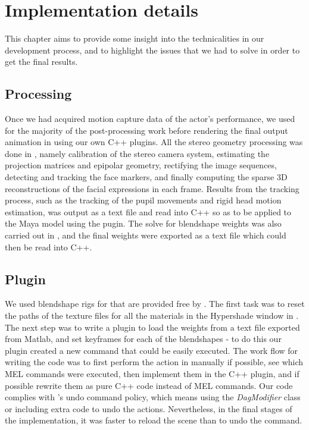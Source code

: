 \chapter{Implementation details}
\label{ch:implementation_details}

This chapter aims to provide some insight into the technicalities in our development process, and to highlight the issues that we had to solve in order to get the final results. 

\section{\Matlab Processing}

Once we had acquired motion capture data of the actor's performance, we used \Matlab for the majority of the post-processing work before rendering the final output animation in \Maya using our own C++ plugins. All the stereo geometry processing was done in \Matlab, namely calibration of the stereo camera system, estimating the projection matrices and epipolar geometry, rectifying the image sequences, detecting and tracking the face markers, and finally computing the sparse 3D reconstructions of the facial expressions in each frame. Results from the tracking process, such as the tracking of the pupil movements and rigid head motion estimation, was output as a text file and read into C++ so as to be applied to the Maya model using the \Maya pugin. The solve for blendshape weights was also carried out in \Matlab, and the final weights were exported as a text file which could then be read into C++. 

\section{\Maya Plugin}
\label{sec:maya_plugin}

We used blendshape rigs for \Maya that are provided free by \cite{FaceWareRigsWeb}. The first task was to reset the paths of the texture files for all the materials in the Hypershade window in \Maya.
The next step was to write a plugin to load the weights from a text file exported from Matlab, and set keyframes for each of the blendshapes - to do this our plugin created a new \Maya command that could be easily executed. 
The work flow for writing the code was to first perform the action in \Maya manually if possible, see which MEL commands were executed, then implement them in the C++ plugin, and if possible rewrite them as pure C++ code instead of MEL commands.
Our code complies with \Maya's undo command policy, which means using the \emph{DagModifier} class or including extra code to undo the actions.
Nevertheless, in the final stages of the implementation, it was faster to reload the scene than to undo the command.

